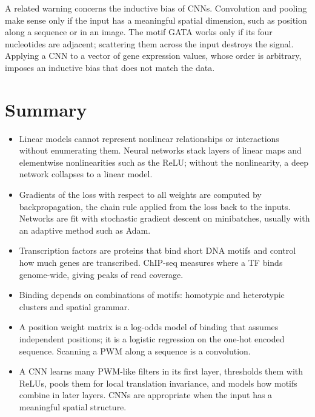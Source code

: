 A related warning concerns the inductive bias of CNNs. Convolution and pooling make sense only if the input has a meaningful spatial dimension, such as position along a sequence or in an image. The motif GATA works only if its four nucleotides are adjacent; scattering them across the input destroys the signal. Applying a CNN to a vector of gene expression values, whose order is arbitrary, imposes an inductive bias that does not match the data.

\section{Summary}

\begin{itemize}
  \item Linear models cannot represent nonlinear relationships or interactions without enumerating them. Neural networks stack layers of linear maps and elementwise nonlinearities such as the ReLU; without the nonlinearity, a deep network collapses to a linear model.
  \item Gradients of the loss with respect to all weights are computed by backpropagation, the chain rule applied from the loss back to the inputs. Networks are fit with stochastic gradient descent on minibatches, usually with an adaptive method such as Adam.
  \item Transcription factors are proteins that bind short DNA motifs and control how much genes are transcribed. ChIP-seq measures where a TF binds genome-wide, giving peaks of read coverage.
  \item Binding depends on combinations of motifs: homotypic and heterotypic clusters and spatial grammar.
  \item A position weight matrix is a log-odds model of binding that assumes independent positions; it is a logistic regression on the one-hot encoded sequence. Scanning a PWM along a sequence is a convolution.
  \item A CNN learns many PWM-like filters in its first layer, thresholds them with ReLUs, pools them for local translation invariance, and models how motifs combine in later layers. CNNs are appropriate when the input has a meaningful spatial structure.
\end{itemize}

